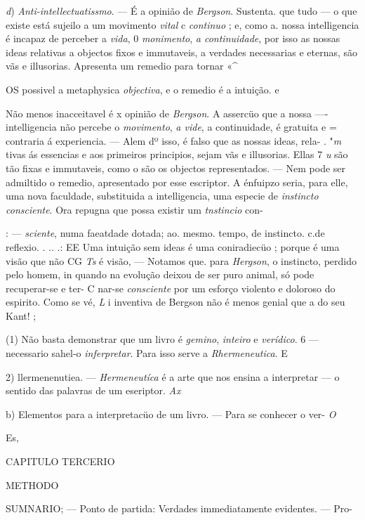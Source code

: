 \emph{d}) \emph{Anti-intellectuatissmo}. --- É a opinião de \emph{Bergson}. Sustenta. que tudo --- o que existe está sujeilo a um movimento \emph{vital} c \emph{continuo} ; e, como a. nossa intelligencia é incapaz de perceber a \emph{vida}, 0 \emph{monimento}, \emph{a continuidade}, por isso as nossas ideas relativas a objectos fixos e immutaveis, a verdades necessarias e eternas, são vãs e illusorias. Apresenta um remedio para tornar «\textasciicircum{}

OS possivel a metaphysica \emph{objectiva}, e o remedio é a intuição. e

Não menos inacceitavel é x opinião de \emph{Bergson}. A assercüo que a nossa ---- intelligencia não percebe o \emph{movimento}, \emph{a vide}, a continuidade, é gratuita e = contraria á experiencia. --- Alem dº isso, é falso que as nossas ideas, rela- . "\emph{m} tivas ás essencias e aos primeiros principios, sejam vãs e illusorias. Ellas 7 \emph{u} são tão fixas e immutaveis, como o são os objectos representados. --- Nem pode ser admiltido o remedio, apresentado por esse escriptor. A énfuipzo seria, para elle, uma nova faculdade, substituida a intelligencia, uma especie de \emph{instincto consciente}. Ora repugna que possa existir um \emph{tnstincio} con-

: --- \emph{sciente}, numa faeatdade dotada; ao. mesmo. tempo, de instincto. c.de reflexio. . .. .: EE Uma intuição sem ideas é uma coniradiecüo ; porque é uma visão que não CG \emph{Ts} é visão, --- Notamos que. para \emph{Hergson}, o instincto, perdido pelo homem, in quando na evolução deixou de ser puro animal, só pode recuperar-se e ter- C nar-se \emph{consciente} por um esforço violento e doloroso do espirito. Como se vé, \emph{L} i inventiva de Bergson não é menos genial que a do seu Kant! ;

(1) Não basta demonstrar que um livro é \emph{gemino}, \emph{inteiro} e \emph{verídico}. 6 --- necessario sahel-o \emph{inferpretar}. Para isso serve a \emph{Rhermeneutica}. E

2) llermenenutiea. --- \emph{Hermeneutíca} é a arte que nos ensina a interpretar --- o sentido das palavras de um eseriptor. \emph{Ax}

b) Elementos para a interpretacüo de um livro. --- Para se conhecer o ver- \emph{O}

Es,

CAPITULO TERCERIO

METHODO

\textsc{SUMNARIO}; --- Ponto de partida: Verdades immediatamente evidentes. --- Pro-

